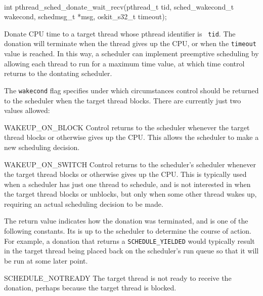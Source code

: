\label{sched-donate-wait-recv}
\begin{apisyn}
	\\

	\funcproto int pthread_sched_donate_wait_recv(pthread_t tid,
			sched_wakecond_t wakecond, schedmsg_t *msg,
			oskit_s32_t timeout);
\end{apisyn}
\begin{apidesc}
	Donate CPU time to a target thread whose pthread identifier is {\tt
	tid}. The donation will terminate when the thread gives up the CPU,
	or when the \texttt{timeout} value is reached. In this way, a
	scheduler can implement preemptive scheduling by allowing each
	thread to run for a maximum time value, at which time control
	returns to the dontating scheduler.

	The \texttt{wakecond} flag specifies under which circumstances
	control should be returned to the scheduler when the target thread
	blocks. There are currently just two values allowed:
	\begin{icsymlist}
	\item[WAKEUP_ON_BLOCK] Control returns to the scheduler whenever
	the target thread blocks or otherwise gives up the CPU\@. This allows
	the scheduler to make a new scheduling decision.

	\item[WAKEUP_ON_SWITCH] Control returns to the scheduler's
	scheduler whenever the target thread blocks or otherwise gives up
	the CPU\@. This is typically used when a scheduler has just one
	thread to schedule, and is not interested in when the target thread
	blocks or unblocks, but only when some other thread wakes up,
	requiring an actual scheduling decision to be made.
	\end{icsymlist}

	The return value indicates how the donation was terminated, and is
	one of the following constants. Its is up to the scheduler to
	determine the course of action. For example, a donation that
	returns a \texttt{SCHEDULE_YIELDED} would typically result in the
	target thread being placed back on the scheduler's run queue so
	that it will be run at some later point.
	\begin{icsymlist}
	\item[SCHEDULE_NOTREADY] The target thread is not ready to receive
	the donation, perhaps because the target thread is blocked.


\end{icsymlist}
\end{apidesc}
